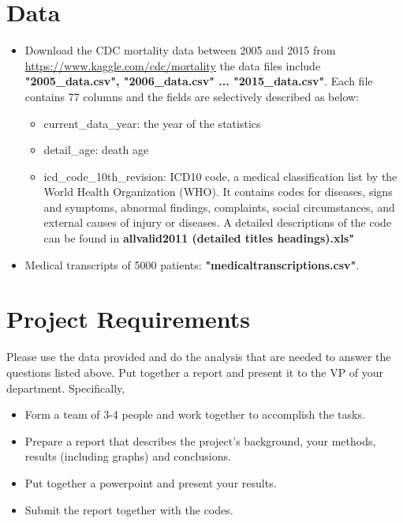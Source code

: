 \documentclass{article}
\begin{document}
\section{Data} %
\begin{itemize}
\item Download the CDC mortality data between 2005 and 2015 from \url{https://www.kaggle.com/cdc/mortality} the data files include \textbf{"2005\_data.csv", "2006\_data.csv" ... "2015\_data.csv"}. Each file contains 77 columns and the fields are selectively described as below:
\begin{itemize}
\item current\_data\_year: the year of the statistics
\item detail\_age: death age
\item icd\_code\_10th\_revision: ICD10 code, a medical classification list by the World Health Organization (WHO). It contains codes for diseases, signs and symptoms, abnormal findings, complaints, social circumstances, and external causes of injury or diseases. A detailed descriptions of the code can be found in \textbf{allvalid2011 (detailed titles headings).xls"}
\end{itemize}
\item Medical transcripts of 5000 patients: \textbf{"medicaltranscriptions.csv"}.

\end{itemize}

\section{Project Requirements}
Please use the data provided and do the analysis that are needed to answer the questions listed above. Put together a report and present it to the VP of your department. Specifically, 
\begin{itemize}
\item Form a team of 3-4 people and work together to accomplish the tasks.
\item Prepare a report that describes the project's background, your methods, results (including graphs) and conclusions.
\item Put together a powerpoint and present your results.
\item Submit the report together with the codes.
\end{itemize}
\end{document}
